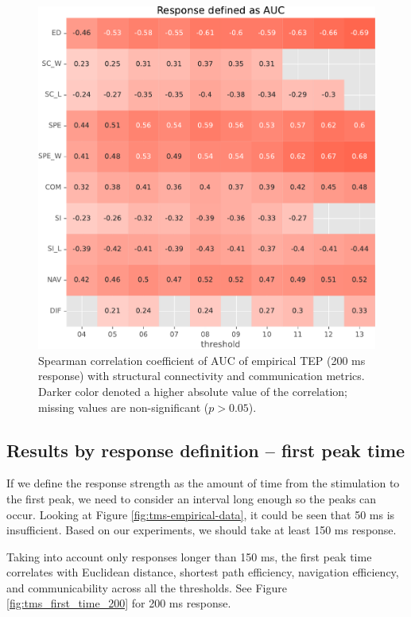 \begin{figure}
    \centering
    \includegraphics[width=\textwidth]{images/nootebook_generated/pytepfit_results/empirical/200/not_over_threshold_nan/Response defined as AUC.pdf}
    \caption[TEPs AUC (200 ms) correlations]{Spearman correlation coefficient of AUC of empirical TEP (200 ms response) with structural connectivity and communication metrics. Darker color denoted a higher absolute value of the correlation; missing values are non-significant ($p>0.05$).}
    \label{fig:tms_auc_200}
\end{figure}

\subsection{Results by response definition -- first peak time}

If we define the response strength as the amount of time from the stimulation to the first peak, we need to consider an interval long enough so the peaks can occur. Looking at Figure \ref{fig:tms-empirical-data}, it could be seen that 50 ms is insufficient. Based on our experiments, we should take at least 150 ms response. 

Taking into account only responses longer than 150 ms, the first peak time correlates with Euclidean distance, shortest path efficiency, navigation efficiency, and communicability across all the thresholds. See Figure \ref{fig:tms_first_time_200} for 200 ms response.

